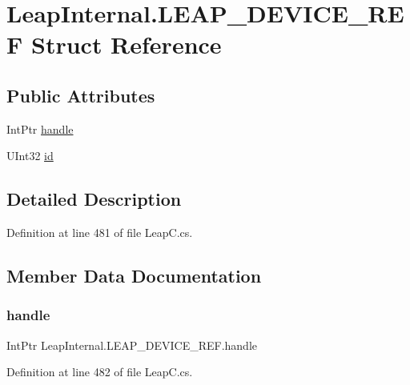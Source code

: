 \hypertarget{struct_leap_internal_1_1_l_e_a_p___d_e_v_i_c_e___r_e_f}{}\section{Leap\+Internal.\+L\+E\+A\+P\+\_\+\+D\+E\+V\+I\+C\+E\+\_\+\+R\+EF Struct Reference}
\label{struct_leap_internal_1_1_l_e_a_p___d_e_v_i_c_e___r_e_f}
\subsection*{Public Attributes}
\begin{DoxyCompactItemize}
\item 
Int\+Ptr \mbox{\hyperlink{struct_leap_internal_1_1_l_e_a_p___d_e_v_i_c_e___r_e_f_af26bcca095bed79967c6e4185c580a9b}{handle}}
\item 
U\+Int32 \mbox{\hyperlink{struct_leap_internal_1_1_l_e_a_p___d_e_v_i_c_e___r_e_f_aec933a04d2bc4dd49ce5dc13289b1d2d}{id}}
\end{DoxyCompactItemize}


\subsection{Detailed Description}


Definition at line 481 of file Leap\+C.\+cs.



\subsection{Member Data Documentation}
\mbox{\label{struct_leap_internal_1_1_l_e_a_p___d_e_v_i_c_e___r_e_f_af26bcca095bed79967c6e4185c580a9b}} 
\subsubsection{\texorpdfstring{handle}{handle}}
{\footnotesize\ttfamily Int\+Ptr Leap\+Internal.\+L\+E\+A\+P\+\_\+\+D\+E\+V\+I\+C\+E\+\_\+\+R\+E\+F.\+handle}



Definition at line 482 of file Leap\+C.\+cs.

\mbox{\label{struct_leap_internal_1_1_l_e_a_p___d_e_v_i_c_e___r_e_f_aec933a04d2bc4dd49ce5dc13289b1d2d}} 
